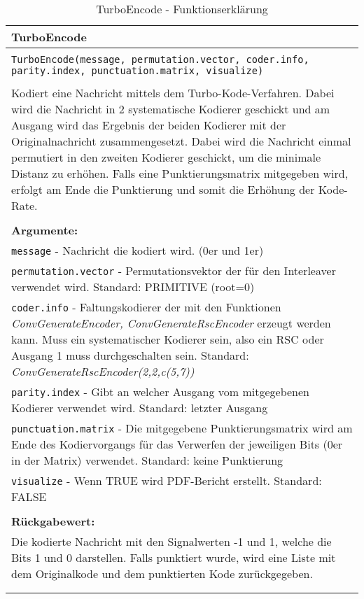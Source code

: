 \begin{longtable}{|p{\textwidth}|}
\hline
\rowcolor{lightblue}TurboEncode\\
\hline
\\
\texttt{TurboEncode(message, permutation.vector, coder.info, parity.index, punctuation.matrix, visualize)}\\
\\
Kodiert eine Nachricht mittels dem Turbo-Kode-Verfahren. Dabei wird die Nachricht in 2 systematische Kodierer geschickt und am Ausgang wird das Ergebnis der beiden Kodierer mit der Originalnachricht zusammengesetzt. Dabei wird die Nachricht einmal permutiert in den zweiten Kodierer geschickt, um die minimale Distanz zu erhöhen. Falls eine Punktierungsmatrix mitgegeben wird, erfolgt am Ende die Punktierung und somit die Erhöhung der Kode-Rate.\\
\\
\textbf{Argumente:}\\
\texttt{message} - Nachricht die kodiert wird. (0er und 1er)\\
\texttt{permutation.vector} - Permutationsvektor der für den Interleaver verwendet wird. Standard: PRIMITIVE (root=0)\\
\texttt{coder.info} - Faltungskodierer der mit den Funktionen \emph{ConvGenerateEncoder, ConvGenerateRscEncoder} erzeugt werden kann. Muss ein systematischer Kodierer sein, also ein RSC oder Ausgang 1 muss durchgeschalten sein. Standard: \emph{ConvGenerateRscEncoder(2,2,c(5,7))}\\
\texttt{parity.index} - Gibt an welcher Ausgang vom mitgegebenen Kodierer verwendet wird. Standard: letzter Ausgang\\
\texttt{punctuation.matrix} - Die mitgegebene Punktierungsmatrix wird am Ende des Kodiervorgangs für das Verwerfen der jeweiligen Bits (0er in der Matrix) verwendet. Standard: keine Punktierung\\
\texttt{visualize} - Wenn TRUE wird PDF-Bericht erstellt. Standard: FALSE\\
\\
\textbf{Rückgabewert:}\\
Die kodierte Nachricht mit den Signalwerten -1 und 1, welche die Bits 1 und 0 darstellen. Falls punktiert wurde, wird eine Liste mit dem Originalkode und dem punktierten Kode zurückgegeben.\\
\\
\hline
\caption[TurboEncode]{TurboEncode - Funktionserklärung}
\end{longtable}